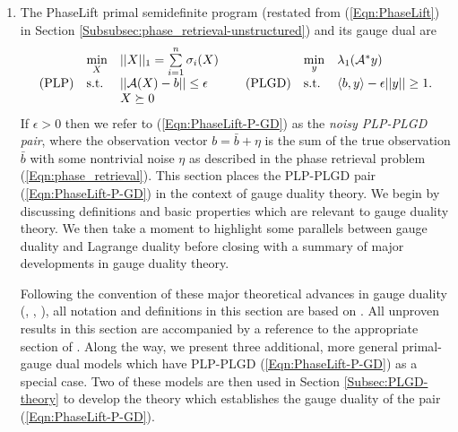 \begin{enumerate}



\item

The PhaseLift primal semidefinite program (restated from (\ref{Eqn:PhaseLift}) in Section \ref{Subsubsec:phase_retrieval-unstructured}) and its gauge dual are
\begin{equation} \label{Eqn:PhaseLift-P-GD}
\begin{array}{lllllll}
	&	\min\limits_{\substack{X}}
		&	||X||_1 = \sum\limits_{\substack{i=1}}^{\substack{n}} \sigma_i(X)
			&
				&	\min\limits_{\substack{y}}
					&	\lambda_1({\mathcal A}^* y)
						\\
\textnormal{(PLP)}
	&	\textnormal{s.t.}
		& 	|| {\mathcal A} (X) - b || \leq \epsilon
			&	\hspace{0.4cm} 	\textnormal{(PLGD)}
				&	\textnormal{s.t.}
					&	\langle b, y \rangle - \epsilon ||y|| \geq 1.
						\\

	&
		&	X \succeq 0

\end{array}
\end{equation}
If $\epsilon > 0$ then we refer to (\ref{Eqn:PhaseLift-P-GD}) as the \textit{noisy PLP-PLGD pair}, where the observation vector $b = \bar{b} + \eta$ is the sum of the true observation $\bar{b}$ with some nontrivial noise $\eta$ as described in the phase retrieval problem (\ref{Eqn:phase_retrieval}).  This section places the PLP-PLGD pair (\ref{Eqn:PhaseLift-P-GD}) in the context of gauge duality theory.  We begin by discussing definitions and basic properties which are relevant to gauge duality theory.  We then take a moment to highlight some parallels between gauge duality and Lagrange duality before closing with a summary of major developments in gauge duality theory.  

Following the convention of these major theoretical advances in gauge duality (\cite{DBLP:journals/mp/Freund87}, \cite{DBLP:journals/siamsc/FriedlanderM16}, \cite{aravkin2017foundations}), all notation and definitions in this section are based on \cite{rockafellar1970convex}.  All unproven results in this section are accompanied by a reference to the appropriate section of \cite{rockafellar1970convex}.  Along the way, we present three additional, more general primal-gauge dual models which have PLP-PLGD (\ref{Eqn:PhaseLift-P-GD}) as a special case.  Two of these models are then used in Section \ref{Subsec:PLGD-theory} to develop the theory which establishes the gauge duality of the pair (\ref{Eqn:PhaseLift-P-GD}).



\end{enumerate}
